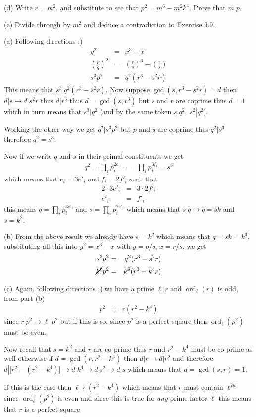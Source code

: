 \documentclass[aps,preprint,preprintnumbers,nofootinbib,showpacs,prd]{revtex4-1}
\newcommand{\nbea}{\begin{eqnarray*}}
\newcommand{\neea}{\end{eqnarray*}}
\DeclareMathOperator{\ord}{ord}
\begin{document}
(d) Write $r = m^2$, and substitute to see that $p^2 = m^6 -m^2 k^4$. Prove
that $m | p$.

(e) Divide through by $m^2$ and deduce a contradiction to Exercise 6.9.

(a) Following directions :)
%
\nbea
y^2 & = & x^3 - x \\
\left ( \frac{p}{q} \right )^2 & = & \left ( \frac{r}{s} \right )^3 - \left ( \frac{r}{s} \right ) \\
s^3 p^2 & = & q^2(r^3 - s^2r)
\neea
%
This means that $s^3|q^2(r^3 - s^2r)$. Now suppose $\gcd(s,r^3 - s^2r) = d$ then $d|s \to d |s^2r$ thus $d|r^3$ thus $d = \gcd(s,r^3)$ but $s$ and $r$ are coprime thus $d = 1$ which in turn means that $s^3|q^2$ (and by the same token $s|q^2,~s^2|q^2$).

Working the other way we get $q^2 | s^3 p^2$ but $p$ and $q$ are coprime thus $q^2|s^3$ therefore $q^2 = s^3$.

Now if we write $q$ and $s$ in their primal constituents we get
%
\nbea
q^2 = \prod_i p_i^{2e_i} & = & \prod_i p_i^{3f_i} = s^3
\neea
%
which means that $e_i = 3 e'_i$ and $f_i = 2f'_i$ such that 
%
\nbea
2\cdot 3 e'_i & = & 3\cdot2 f'_i \\
e'_i & = & f'_i
\neea
%
this means $q = \prod_i p_i^{3e'_i}$ and $s = \prod_i p_i^{2e'_i}$ which means that $s|q \to q = sk$ and $s = k^2$.

(b) From the above result we already have $s = k^2$ which means that $q = sk = k^3$, substituting all this into $y^2 = x^3 - x$ with $y = p/q$, $x = r/s$, we get
%
\nbea
s^3 p^2 & = & q^2(r^3 - s^2r) \\
\cancel{k^6} p^2 & = & \cancel{k^6}(r^3 - k^4 r)
\neea
%

(c) Again, following directions :) we have a prime $\ell|r$ and $\ord_\ell(r)$ is odd, from part (b)
%
\nbea
p^2 & = & r(r^2 - k^4)
\neea
%
since $r|p^2 \to \ell | p^2$ but if this is so, since $p^2$ is a perfect square then $\ord_\ell(p^2)$ must be even.

Now recall that $s = k^2$ and $r$ are co prime thus $r$ and $r^2 - k^4$ must be co prime as well otherwise if $d = \gcd(r, r^2 - k^4)$ then $d|r \to d|r^2$ and therefore $d|\lbrack r^2 - (r^2 - k^4) \rbrack \to d | k^4 \to d |s^2 \to d|s$ which means that $d = \gcd(s,r) = 1$.

If this is the case then $\ell \nmid (r^2 - k^4)$ which means that $r$ must contain $\ell^{2w}$ since $\ord_\ell(p^2)$ is even and since this is true for {\it any} prime factor $\ell$ this means that $r$ is a perfect square
\end{document}
